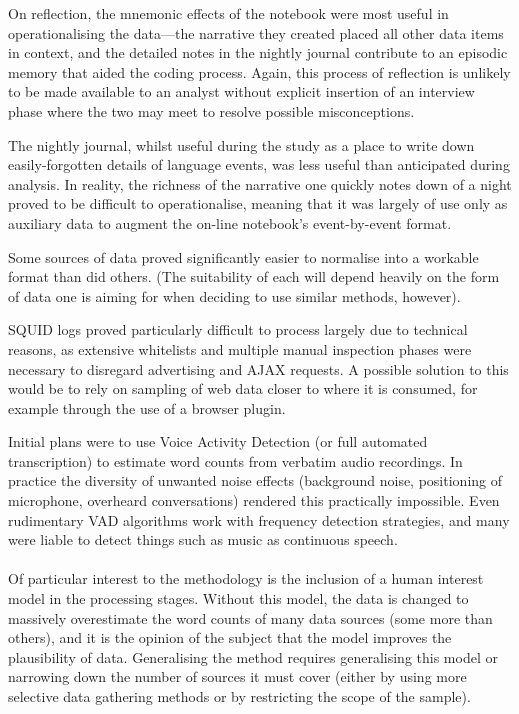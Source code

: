 On reflection, the mnemonic effects of the notebook were most useful in operationalising the data---the narrative they created placed all other data items in context, and the detailed notes in the nightly journal contribute to an episodic memory that aided the coding process.  Again, this process of reflection is unlikely to be made available to an analyst without explicit insertion of an interview phase where the two may meet to resolve possible misconceptions.

The nightly journal, whilst useful during the study as a place to write down easily-forgotten details of language events, was less useful than anticipated during analysis.  In reality, the richness of the narrative one quickly notes down of a night proved to be difficult to operationalise, meaning that it was largely of use only as auxiliary data to augment the on-line notebook's event-by-event format.

Some sources of data proved significantly easier to normalise into a workable format than did others.  (The suitability of each will depend heavily on the form of data one is aiming for when deciding to use similar methods, however).

SQUID logs proved particularly difficult to process largely due to technical reasons, as extensive whitelists and multiple manual inspection phases were necessary to disregard advertising and AJAX requests.  A possible solution to this would be to rely on sampling of web data closer to where it is consumed, for example through the use of a browser plugin.

Initial plans were to use Voice Activity Detection (or full automated transcription) to estimate word counts from verbatim audio recordings.  In practice the diversity of unwanted noise effects (background noise, positioning of microphone, overheard conversations) rendered this practically impossible.  Even rudimentary VAD algorithms work with frequency detection strategies, and many were liable to detect things such as music as continuous speech.  



\paragraph{}
Of particular interest to the methodology is the inclusion of a human interest model in the processing stages.  Without this model, the data is changed to massively overestimate the word counts of many data sources (some more than others), and it is the opinion of the subject that the model improves the plausibility of data.  Generalising the method requires generalising this model or narrowing down the number of sources it must cover (either by using more selective data gathering methods or by restricting the scope of the sample).  

